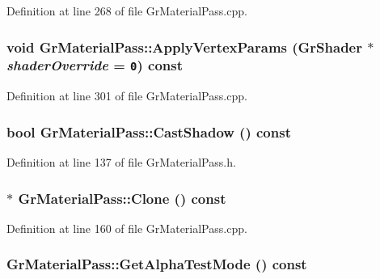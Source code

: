 Definition at line 268 of file GrMaterialPass.cpp.\hypertarget{class_gr_material_pass_7ef513dc8a50374348a402c10a3f3cd0}{
\subsubsection[{ApplyVertexParams}]{\setlength{\rightskip}{0pt plus 5cm}void GrMaterialPass::ApplyVertexParams ({\bf GrShader} $\ast$ {\em shaderOverride} = {\tt 0}) const}}
\label{class_gr_material_pass_7ef513dc8a50374348a402c10a3f3cd0}




Definition at line 301 of file GrMaterialPass.cpp.\hypertarget{class_gr_material_pass_c968cf3eafd243fa2de5ffaf3e3d2981}{
\subsubsection[{CastShadow}]{\setlength{\rightskip}{0pt plus 5cm}bool GrMaterialPass::CastShadow () const}}
\label{class_gr_material_pass_c968cf3eafd243fa2de5ffaf3e3d2981}




Definition at line 137 of file GrMaterialPass.h.\hypertarget{class_gr_material_pass_98a5f91d9690f1e6cba0fc5355f96529}{
\subsubsection[{Clone}]{ $\ast$ GrMaterialPass::Clone () const}}
\label{class_gr_material_pass_98a5f91d9690f1e6cba0fc5355f96529}




Definition at line 160 of file GrMaterialPass.cpp.\hypertarget{class_gr_material_pass_bcc04a3190ab557eebf814382b055dd7}{
\subsubsection[{GetAlphaTestMode}]{ GrMaterialPass::GetAlphaTestMode () const}}
\label{class_gr_material_pass_bcc04a3190ab557eebf814382b055dd7}




